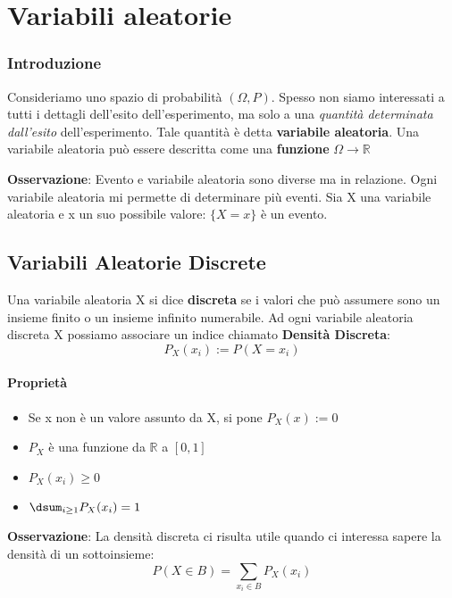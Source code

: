\chapter{Variabili aleatorie}

\subsection{Introduzione}

Consideriamo uno spazio di probabilità $(\Omega, P)$. Spesso non siamo interessati a tutti i dettagli dell'esito dell'esperimento, ma solo a una \textit{quantità determinata dall'esito} dell'esperimento. Tale quantità è detta \textbf{variabile aleatoria}. \newline Una variabile aleatoria può essere descritta come una \textbf{funzione} $\Omega \xrightarrow{} \mathbb{R}$ \newline

\noindent \textbf{Osservazione}: Evento e variabile aleatoria sono diverse ma in relazione. Ogni variabile aleatoria mi permette di determinare più eventi. 
Sia X una variabile aleatoria e x un suo possibile valore: $\{X = x\}$ è un evento.\newline

\section{Variabili Aleatorie Discrete}

Una variabile aleatoria X si dice \textbf{discreta} se i valori che può assumere sono un insieme finito o un insieme infinito numerabile.  \newline Ad ogni variabile aleatoria discreta X possiamo associare un indice chiamato \textbf{Densità Discreta}: $$P_X(x_i) := P(X = x_i)$$

\subsubsection{Proprietà}
\begin{itemize}
    \item Se x non è un valore assunto da X, si pone $P_X(x) := 0$
    \item $P_X$ è una funzione da $\mathbb{R}$ a $[0,1]$
    \item $P_X(x_i) \geq 0$
    \item $\dsum_{i \geq 1} P_X(x_i) =1$
\end{itemize} 

\noindent \textbf{Osservazione}: La densità discreta ci risulta utile quando ci interessa sapere la densità di un sottoinsieme: $$P(X \in B) = \sum_{x_i \in B} P_X(x_i)$$ 

